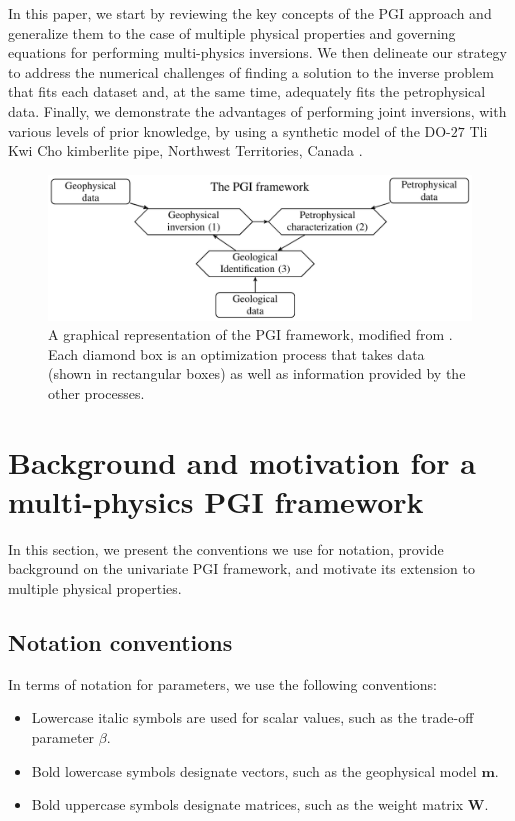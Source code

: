 \documentclass[extra, mreferee]{gji_joint} %
\begin{document}
In this paper, we start by reviewing the key concepts of the PGI approach and generalize them to the case of multiple physical properties and governing equations for performing multi-physics inversions. We then delineate our strategy to address the numerical challenges of finding a solution to the inverse problem that fits each dataset and, at the same time, adequately fits the petrophysical data. Finally, we demonstrate the advantages of performing joint inversions, with various levels of prior knowledge, by using a synthetic model of the DO-$27$ Tli Kwi Cho kimberlite pipe, Northwest Territories, Canada \citep{JansenEtAl2004}.

\begin{figure}
    \includegraphics[width=\columnwidth]{Fig/LowRes/New_Framework_with_numbers.pdf}
    \caption{A graphical representation of the PGI framework, modified from \citet{ggz389}. Each diamond box is an optimization process that takes data (shown in rectangular boxes) as well as information provided by the other processes.}
    \label{fig:Framework_with_numbers.pdf}
\end{figure}

\section{Background and motivation for a multi-physics PGI framework}

In this section, we present the conventions we use for notation, provide background on the univariate PGI framework, and motivate its extension to multiple physical properties.

\subsection{Notation conventions}

In terms of notation for parameters, we use the following conventions:

\begin{itemize}
\item Lowercase italic symbols are used for scalar values, such as the trade-off parameter $\beta$.
\item Bold lowercase symbols designate vectors, such as the geophysical model $\mathbf{m}$.
\item Bold uppercase symbols designate matrices, such as the weight matrix $\mathbf{W}$.
\end{itemize}
\end{document}
